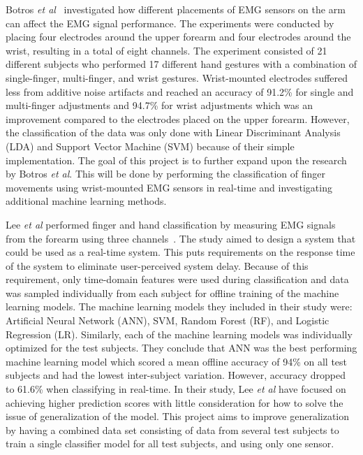 Botros \textit{et al}~\cite{botrosElectromyographyBasedGestureRecognition2022} investigated how different placements of EMG sensors on the arm can affect the EMG signal performance. The experiments were conducted by placing four electrodes around the upper forearm and four electrodes around the wrist, resulting in a total of eight channels. The experiment consisted of 21 different subjects who performed 17 different hand gestures with a combination of single-finger, multi-finger, and wrist gestures. Wrist-mounted electrodes suffered less from additive noise artifacts and reached an accuracy of 91.2\% for single and multi-finger adjustments and 94.7\% for wrist adjustments which was an improvement compared to the electrodes placed on the upper forearm. However, the classification of the data was only done with Linear Discriminant Analysis (LDA) and Support Vector Machine (SVM) because of their simple implementation. The goal of this project is to further expand upon the research by Botros \textit{et al}. This will be done by performing the classification of finger movements using wrist-mounted EMG sensors in real-time and investigating additional machine learning methods.

Lee \textit{et al} performed finger and hand classification by measuring EMG signals from the forearm using three channels~\cite{leeElectromyogramBasedClassificationHand2021}. The study aimed to design a system that could be used as a real-time system. This puts requirements on the response time of the system to eliminate user-perceived system delay. Because of this requirement, only time-domain features were used during classification and data was sampled individually from each subject for offline training of the machine learning models. The machine learning models they included in their study were: Artificial Neural Network (ANN), SVM, Random Forest (RF), and Logistic Regression (LR). Similarly, each of the machine learning models was individually optimized for the test subjects. They conclude that ANN was the best performing machine learning model which scored a mean offline accuracy of 94\% on all test subjects and had the lowest inter-subject variation. However, accuracy dropped to 61.6\% when classifying in real-time. In their study, Lee \textit{et al} have focused on achieving higher prediction scores with little consideration for how to solve the issue of generalization of the model. This project aims to improve generalization by having a combined data set consisting of data from several test subjects to train a single classifier model for all test subjects, and using only one sensor.

